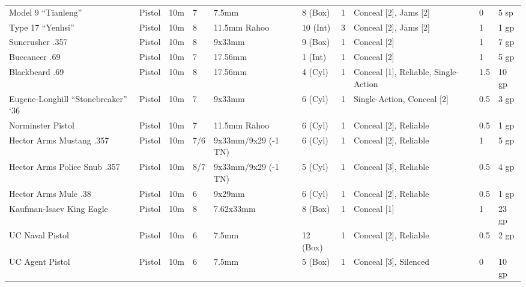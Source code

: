 \documentclass[a4paper, twocolumn, openany]{book}
\begin{document}
{{{\begin{tabular}{p{3cm}lllp{2cm}llp{2.7cm}ll}
	Model 9 “Tianleng”						& Pistol & 10m 	& 7 	& 7.5mm 							& 8 (Box) 		& 1		& Conceal [2], Jams [2] 				& 0 	& 5 sp 	\\
	Type 17 “Yenhsi”						& Pistol & 10m 	& 8 	& 11.5mm \newline Rahoo 			& 10 (Int) 		& 3		& Conceal [2], Jams [2] 				& 1 	& 1 gp 	\\
	Suncrusher .357							& Pistol & 10m 	& 8 	& 9x33mm 							& 9 (Box) 		& 1		& Conceal [2] 							& 1 	& 7 gp 	\\
	Buccaneer .69							& Pistol & 10m 	& 7 	& 17.56mm 							& 1 (Int) 		& 1		& Conceal [2] 							& 1 	& 5 gp 	\\
	Blackbeard .69							& Pistol & 10m 	& 8 	& 17.56mm 							& 4 (Cyl) 		& 1		& Conceal [1], \newline Reliable, \newline Single-Action 	& 1.5 	& 10 gp \\
	Eugene-Longhill “Stonebreaker” ‘36 		& Pistol & 10m	& 7		& 9x33mm							& 6 (Cyl) 		& 1 	& Single-Action, Conceal [2] 			& 0.5	& 3 gp \\
	Norminster Pistol 						& Pistol & 10m	& 7		& 11.5mm \newline Rahoo				& 6 (Cyl) 		& 1 	& Conceal [2], \newline Reliable 				& 0.5	& 1 gp \\
	Hector Arms Mustang .357 				& Pistol & 10m	& 7/6	& 9x33mm/\linebreak[0]9x29 (-1 TN)	& 6 (Cyl) 		& 1 	& Conceal [2], \newline Reliable 				& 1		& 5 gp \\
	Hector Arms Police Snub .357 			& Pistol & 10m	& 8/7	& 9x33mm/\linebreak[0]9x29 (-1 TN)	& 5 (Cyl) 		& 1 	& Conceal [3], \newline Reliable 				& 0.5	& 4 gp \\
	Hector Arms Mule .38 					& Pistol & 10m	& 6		& 9x29mm				& 6 (Cyl) 	& 1 			& Conceal [2], \newline Reliable 				& 0.5	& 1 gp \\
	Kaufman-Isaev King Eagle 				& Pistol & 10m	& 8		& 7.62x33mm				& 8 (Box) 	& 1 			& Conceal [1] 							& 1		& 23 gp \\
	UC Naval Pistol 						& Pistol & 10m	& 6		& 7.5mm					& 12 (Box) 	& 1 			& Conceal [2], \newline Reliable 				& 0.5	& 2 gp \\
	UC Agent Pistol 						& Pistol & 10m	& 6		& 7.5mm					& 5 (Box) 	& 1 			& Conceal [3], \newline Silenced 				& 0		& 10 gp \\

\end{tabular}}}}
\end{document}
